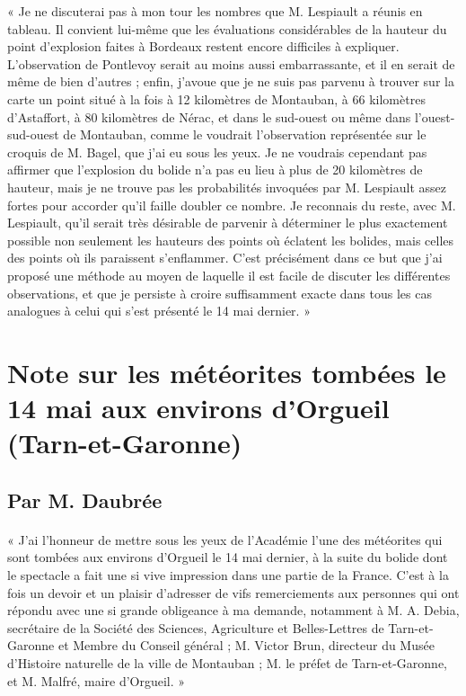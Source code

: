 \documentclass[a4paper, 11pt, oneside, polutonikogreek, french]{article}
\begin{document}
« Je ne discuterai pas à mon tour les nombres que M. Lespiault a réunis en tableau. Il convient lui-même que les évaluations considérables de la hauteur du point d'explosion faites à Bordeaux restent encore difficiles à expliquer. L'observation de Pontlevoy serait au moins aussi embarrassante, et il en serait de même de bien d'autres ; enfin, j'avoue que je ne suis pas parvenu à trouver sur la carte un point situé à la fois à 12 kilomètres de Montauban, à 66 kilomètres d'Astaffort, à 80 kilomètres de Nérac, et dans le sud-ouest ou même dans l'ouest-sud-ouest de Montauban, comme le voudrait l'observation représentée sur le croquis de M. Bagel, que j'ai eu sous les yeux. Je ne voudrais cependant pas affirmer que l'explosion du bolide n'a pas eu lieu à plus de 20 kilomètres de hauteur, mais je ne trouve pas les probabilités invoquées par M. Lespiault assez fortes pour accorder qu'il faille doubler ce nombre. Je reconnais du reste, avec M. Lespiault, qu'il serait très désirable de parvenir à déterminer le plus exactement possible non seulement les hauteurs des points où éclatent les bolides, mais celles des points où ils paraissent s'enflammer. C'est précisément dans ce but que j'ai proposé une méthode au moyen de laquelle il est facile de discuter les différentes observations, et que je persiste à croire suffisamment exacte dans tous les cas analogues à celui qui s'est présenté le 14 mai dernier. »
\clearpage
\section{Note sur les météorites tombées le 14 mai aux environs d'Orgueil (Tarn-et-Garonne)}
\subsection*{Par M. Daubrée}
\paragraph{}
« J'ai l'honneur de mettre sous les yeux de l'Académie l'une des météorites qui sont tombées aux environs d'Orgueil le 14 mai dernier, à la suite du bolide dont le spectacle a fait une si vive impression dans une partie de la France. C'est à la fois un devoir et un plaisir d'adresser de vifs remerciements aux personnes qui ont répondu avec une si grande obligeance à ma demande, notamment à M. A. Debia, secrétaire de la Société des Sciences, Agriculture et Belles-Lettres de Tarn-et-Garonne et Membre du Conseil général ; M. Victor Brun, directeur du Musée d'Histoire naturelle de la ville de Montauban ; M. le préfet de Tarn-et-Garonne, et M. Malfré, maire d'Orgueil. »
\end{document}
